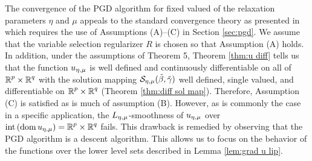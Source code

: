 The convergence of the PGD algorithm for fixed valued of the relaxation parameters
$\eta$ and $\mu$ appeals to the standard convergence theory as presented in
\cite[Chapter 10]{AB17} which requires the use of Assumptions (A)--(C) in Section 
\ref{sec:pgd}. We assume that the
variable selection regularizer $R$ is chosen so that
Assumption (A) holds. 
In addition, under the assumptions of Theorem 5, 
Theorem \ref{thm:u diff} tells us that the function ${u_{\eta,\mu}}$ is well defined and continuously differentiable on all of ${\operatorname{\mathbb{R}}^p}\times{\operatorname{\mathbb{R}}^q}$
with the solution mapping 
$\mathcal{S}_{\eta,\mu}(\tilde\beta,{\tilde{\gamma}})$ well defined, single valued, and differentiable on ${\operatorname{\mathbb{R}}^p}\times{\operatorname{\mathbb{R}}^q}$ 
(Theorem \ref{thm:diff sol map}).
 Therefore, Assumption (C)
is satisfied as is much of assumption (B).
However, as is commonly the case in a specific application, the 
$L_{\eta,\mu}$-smoothness of ${u_{\eta,\mu}}$ over 
$\mathrm{int}\left( \operatorname{\mathrm{dom}}{{u_{\eta,\mu}}}\right)={\operatorname{\mathbb{R}}^p}\times{\operatorname{\mathbb{R}}^q}$ fails. This drawback is remedied by
observing that the 
PGD algorithm is a descent algorithm. This allows us to focus on the behavior of
the functions over the lower level sets
described in Lemma \ref{lem:grad u lip}.

